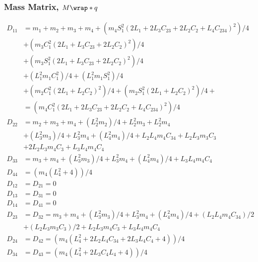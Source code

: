 \subsubsection{Mass Matrix, $M\wrap*{q}$}
\begin{equation}
	\begin{split}
	D_{11}  & = m_{1} + m_{2} + m_{3} + m_{4} + (m_{4} S_{1}^2 (2 L_{1} + 2 L_{3} C_{23} + 2 L_{2} C_{2} + L_{4} C_{234})^2)/4 \\
			& + (m_{3} C_{1}^2 (2 L_{1} + L_{3} C_{23} + 2 L_{2} C_{2})^2)/4 \\ 
			& + (m_{3} S_{1}^2 (2 L_{1} + L_{3} C_{23} + 2 L_{2} C_{2})^2)/4 \\
			& + (L_{1}^2 m_{1} C_{1}^2)/4 + (L_{1}^2 m_{1} S_{1}^2)/4  \\
			& + (m_{2} C_{1}^2 (2 L_{1} + L_{2} C_{2})^2)/4 + (m_{2} S_{1}^2 (2 L_{1} + L_{2} C_{2})^2)/4 + \\
			& = (m_{4} C_{1}^2 (2 L_{1} + 2 L_{3} C_{23} + 2 L_{2} C_{2} + L_{4} C_{234})^2)/4 \\
	D_{22}  & = m_{2} + m_{3} + m_{4} + (L_{2}^2 m_{2})/4 + L_{2}^2 m_{3} + L_{2}^2 m_{4} \\
			& + (L_{3}^2 m_{3})/4 + L_{3}^2 m_{4} + (L_{4}^2 m_{4})/4 + L_{2} L_{4} m_{4} C_{34} + L_{2} L_{3} m_{3} C_{3} \\
			& + 2 L_{2} L_{3} m_{4} C_{3} + L_{3} L_{4} m_{4} C_{4}\\
	D_{33}  & = m_{3} + m_{4} + (L_{3}^2 m_{3})/4 + L_{3}^2 m_{4} + (L_{4}^2 m_{4})/4 + L_{3} L_{4} m_{4} C_{4}\\
	D_{44}  & = (m_{4} (L_{4}^2 + 4))/4\\
	D_{12}  & = D_{21} = 0\\
	D_{13}  & = D_{31} = 0\\
	D_{14}  & = D_{41} = 0\\
	D_{23}  & = D_{32} = m_{3} + m_{4} + (L_{3}^2 m_{3})/4 + L_{3}^2 m_{4} + (L_{4}^2 m_{4})/4 + (L_{2} L_{4} m_{4} C_{34})/2 \\
			& + (L_{2} L_{3} m_{3} C_{3})/2 + L_{2} L_{3} m_{4} C_{3} + L_{3} L_{4} m_{4} C_{4} \\
	D_{24}  & = D_{42} = (m_{4} (L_{4}^2 + 2 L_{2} L_{4} C_{34} + 2 L_{3} L_{4} C_{4} + 4))/4\\
	D_{34} 	& = D_{43} = (m_{4} (L_{4}^2 + 2 L_{3} C_{4} L_{4} + 4))/4
	\end{split}
\end{equation}


